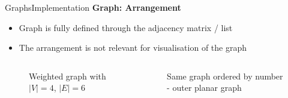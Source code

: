 
\begin{frame}{Graphs}{Implementation}
  \textbf{Graph: Arrangement}
  \begin{itemize}
    \item<2->
      Graph is fully defined through the {\color{MainA}adjacency matrix / list}
    \item<3->
      The arrangement is not relevant for visualisation of the graph
  \end{itemize}
   \begin{columns}
    \begin{column}[b]{0.4\linewidth}
      \begin{figure}[!h]
        \begin{adjustbox}{width=0.8\linewidth}
          
        \end{adjustbox}
        \vspace{-0.75em}
        \caption{Weighted graph with {\color{MainA}$\vert V \vert = 4$},
          {\color{MainA}$\vert E \vert = 6$}}
      \end{figure}
    \end{column}
    \begin{column}[b]{0.55\linewidth}
      \begin{figure}[!h]
        \begin{adjustbox}{width=0.875\linewidth}
          
        \end{adjustbox}
        \vspace{-0.75em}
        \caption{Same graph ordered by number - outer planar graph}
      \end{figure}
    \end{column}
  \end{columns}
\end{frame}



